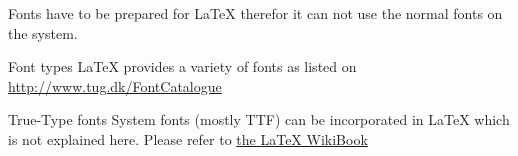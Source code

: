 \begin{frame}
\end{frame}

\begin{frame}
	Fonts have to be prepared for {\LaTeX} therefor it can not use the normal
	fonts on the system.

	\begin{block}{Font types}
		{\LaTeX} provides a variety of fonts as listed on
		\url{http://www.tug.dk/FontCatalogue}
	\end{block}

	\begin{block}{True-Type fonts}
		System fonts (mostly TTF) can be incorporated in {\LaTeX} which is not
		explained here. Please refer to
		\href{http://en.wikibooks.org/wiki/LaTeX/Fonts}{the {\LaTeX} WikiBook}
	\end{block}
\end{frame}
